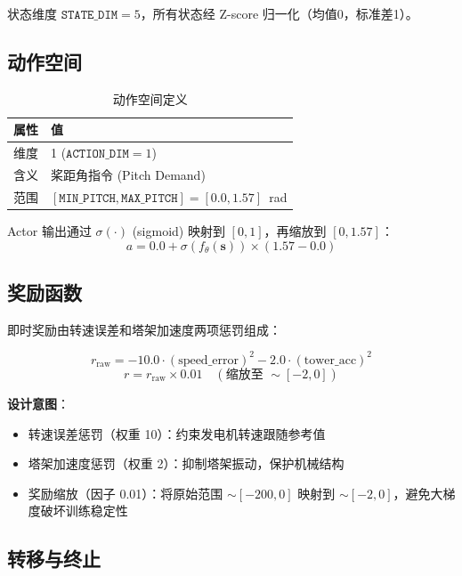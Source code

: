 \documentclass[11pt,a4paper]{ctexart}
\begin{document}
状态维度 $\texttt{STATE\_DIM} = 5$，所有状态经 Z-score 归一化（均值0，标准差1）。

\subsection{动作空间}

\begin{table}[H]
\centering
\caption{动作空间定义}
\begin{tabular}{ll}
\toprule
\textbf{属性} & \textbf{值} \\
\midrule
维度   & 1 ($\texttt{ACTION\_DIM} = 1$) \\
含义   & 桨距角指令 (Pitch Demand) \\
范围   & $[\texttt{MIN\_PITCH}, \texttt{MAX\_PITCH}] = [0.0, 1.57]$~rad \\
\bottomrule
\end{tabular}
\end{table}

Actor 输出通过 $\sigma(\cdot)$ (sigmoid) 映射到 $[0, 1]$，再缩放到 $[0, 1.57]$：
\begin{equation}
    a = 0.0 + \sigma(f_{\theta}(\mathbf{s})) \times (1.57 - 0.0)
\end{equation}

\subsection{奖励函数}

即时奖励由转速误差和塔架加速度两项惩罚组成：

\begin{equation}
    r_{\text{raw}} = -10.0 \cdot (\text{speed\_error})^2 - 2.0 \cdot (\text{tower\_acc})^2
\end{equation}
\begin{equation}
    r = r_{\text{raw}} \times 0.01 \quad (\text{缩放至 } \sim[-2, 0])
\end{equation}

\textbf{设计意图}：
\begin{itemize}
    \item 转速误差惩罚（权重 10）：约束发电机转速跟随参考值
    \item 塔架加速度惩罚（权重 2）：抑制塔架振动，保护机械结构
    \item 奖励缩放（因子 0.01）：将原始范围 $\sim[-200, 0]$ 映射到 $\sim[-2, 0]$，避免大梯度破坏训练稳定性
\end{itemize}

\subsection{转移与终止}
\end{document}
